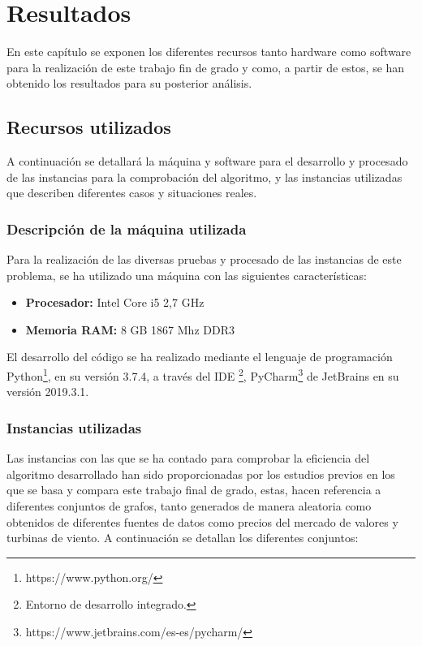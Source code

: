 
\chapter{Resultados} %

\label{Chapter5} %


En este capítulo se exponen los diferentes recursos tanto hardware como software para la realización de este trabajo fin de grado y como, a partir de estos, se han obtenido los resultados para su posterior análisis.

\section{Recursos utilizados}
A continuación se detallará la máquina  y software para el desarrollo y procesado de las instancias para la comprobación del algoritmo, y las instancias utilizadas que describen diferentes casos y situaciones reales.

\subsection{Descripción de la máquina utilizada}
\label{sec:maquina}
Para la realización de las diversas pruebas y procesado de las instancias de este problema, se ha utilizado una máquina con las siguientes características:

\begin{itemize}

\item \textbf{Procesador:} Intel Core i5 2,7 GHz
\item \textbf{Memoria RAM:} 8 GB 1867 Mhz DDR3
\end{itemize}

El desarrollo del código se ha realizado mediante el lenguaje de programación Python\footnote{https://www.python.org/}, en su versión 3.7.4, a través del \gls{IDE} \footnote{Entorno de desarrollo integrado.}, PyCharm\footnote{https://www.jetbrains.com/es-es/pycharm/} de JetBrains en su versión 2019.3.1.

\subsection{Instancias utilizadas}
\label{sec:Instancias-utilizadas}
Las instancias con las que se ha contado para comprobar la eficiencia del algoritmo desarrollado han sido proporcionadas por los estudios previos en los que se basa y compara este trabajo final de grado, estas, hacen referencia a diferentes conjuntos de grafos, tanto generados de manera aleatoria como obtenidos de diferentes fuentes de datos como precios del mercado de valores y turbinas de viento. A continuación se detallan los diferentes conjuntos:

